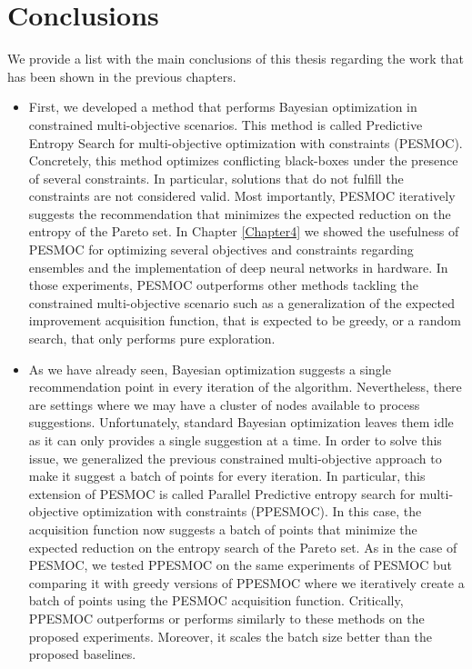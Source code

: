 \section{Conclusions}
We provide a list with the main conclusions of this thesis regarding the work that has been shown in the previous chapters.
\begin{itemize}
    \item First, we developed a method that performs Bayesian optimization in constrained multi-objective scenarios. This method is called Predictive Entropy Search for multi-objective optimization with constraints (PESMOC). Concretely, this method optimizes conflicting black-boxes under the presence of several constraints. In particular, solutions that do not fulfill the constraints are not considered valid. Most importantly, PESMOC iteratively suggests the recommendation that minimizes the expected reduction on the entropy of the Pareto set. In Chapter \ref{Chapter4} we showed the usefulness of PESMOC for optimizing several objectives and constraints regarding ensembles and the implementation of deep neural networks in hardware. In those experiments, PESMOC outperforms other methods tackling the constrained multi-objective scenario such as a generalization of the expected improvement acquisition function, that is expected to be greedy, or a random search, that only performs pure exploration.
    \item As we have already seen, Bayesian optimization suggests a single recommendation point in every iteration of the algorithm. Nevertheless, there are settings where we may have a cluster of nodes available to process suggestions. Unfortunately, standard Bayesian optimization leaves them idle as it can only provides a single suggestion at a time. In order to solve this issue, we generalized the previous constrained multi-objective approach to make it suggest a batch of points for every iteration. In particular, this extension of PESMOC is called Parallel Predictive entropy search for multi-objective optimization with constraints (PPESMOC). In this case, the acquisition function now suggests a batch of points that minimize the expected reduction on the entropy search of the Pareto set. As in the case of PESMOC, we tested PPESMOC on the same experiments of PESMOC but comparing it with greedy versions of PPESMOC where we iteratively create a batch of points using the PESMOC acquisition function. Critically, PPESMOC outperforms or performs similarly to these methods on the proposed experiments. Moreover, it scales the batch size better than the proposed baselines.

\end{itemize}
